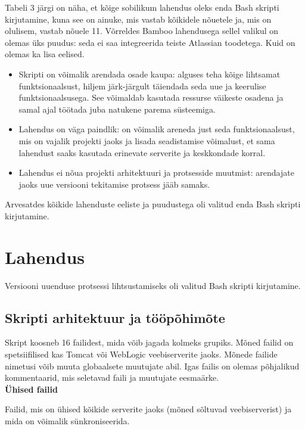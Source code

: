 \documentclass[12pt]{report}
\begin{document}
  Tabeli 3 järgi on näha, et kõige sobilikum lahendus oleks enda Bash skripti kirjutamine, kuna see on ainuke, mis vastab kõikidele nõuetele ja, mis on olulisem, vastab nõuele 11. Võrreldes Bamboo lahendusega sellel valikul on olemas üks puudus: seda ei saa integreerida teiste Atlassian toodetega. Kuid on olemas ka lisa eelised.
  \begin{itemize}
    \item Skripti on võimalik arendada osade kaupa: alguses teha kõige lihtsamat funktsionaalsust, hiljem järk-järgult täiendada seda uue ja keerulise funktsionaalsusega. See võimaldab kasutada ressurse väikeste osadena ja samal ajal töötada juba natukene parema süsteemiga.
    \item Lahendus on väga paindlik: on võimalik areneda just seda funktsionaalsust, mis on vajalik projekti jaoks ja lisada seadistamise võimalust, et sama lahendust saaks kasutada erinevate serverite ja keskkondade korral.
    \item Lahendus ei nõua projekti arhitektuuri ja protsesside muutmist: arendajate jaoks uue versiooni tekitamise protsess jääb samaks.
  \end{itemize}
  
  Arvesatdes kõikide lahenduste eeliste ja puudustega oli valitud enda Bash skripti kirjutamine.
  
  \newpage
  
  \section{Lahendus}
  
  Versiooni uuenduse protsessi lihtsustamiseks oli valitud Bash skripti kirjutamine.
  
  \subsection{Skripti arhitektuur ja tööpõhimõte}
  
  Skript koosneb 16 failidest, mida võib jagada kolmeks grupiks. Mõned failid on spetsiifilised kas Tomcat või WebLogic veebiserverite jaoks. Mõnede failide nimetusi võib muuta globaalsete muutujate abil. Igas failis on olemas põhjalikud kommentaarid, mis seletavad faili ja muutujate eesmaärke.\\

  \textbf{Ühised failid}
  
  Failid, mis on ühised kõikide serverite jaoks (mõned sõltuvad veebiserverist) ja mida on võimalik sünkroniseerida.
  
\end{document}
